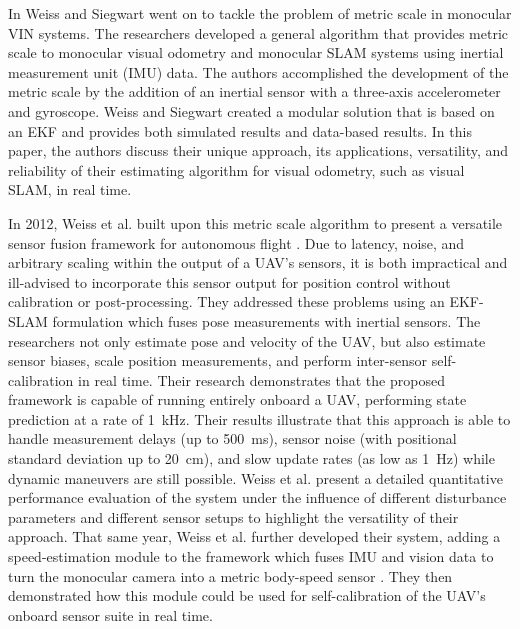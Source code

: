 In \cite{Weiss2011_2} Weiss and Siegwart went on to tackle the problem of metric scale in monocular VIN systems. The researchers developed a general algorithm that provides metric scale to monocular visual odometry and monocular SLAM systems using inertial measurement unit (IMU) data. The authors accomplished the development of the metric scale by the addition of an inertial sensor with a three-axis accelerometer and gyroscope. Weiss and Siegwart created a modular solution that is based on an EKF and provides both simulated results and data-based results. In this paper, the authors discuss their unique approach, its applications, versatility, and reliability of their estimating algorithm for visual odometry, such as visual SLAM, in real time. 

In 2012, Weiss et al. built upon this metric scale algorithm to present a versatile sensor fusion framework for autonomous flight \cite{Weiss2012}. Due to latency, noise, and arbitrary scaling within the output of a UAV's sensors, it is both impractical and ill-advised to incorporate this sensor output for position control without calibration or post-processing. They addressed these problems using an EKF-SLAM formulation which fuses pose measurements with inertial sensors. The researchers not only estimate pose and velocity of the UAV, but also estimate sensor biases, scale position measurements, and perform inter-sensor self-calibration in real time. Their research demonstrates that the proposed framework is capable of running entirely onboard a UAV, performing state prediction at a rate of 1~kHz. Their results illustrate that this approach is able to handle measurement delays (up to 500~ms), sensor noise (with positional standard deviation up to 20~cm), and slow update rates (as low as 1~Hz) while dynamic maneuvers are still possible. Weiss et al. present a detailed quantitative performance evaluation of the system under the influence of different disturbance parameters and different sensor setups to highlight the versatility of their approach. That same year, Weiss et al. further developed their system, adding a speed-estimation module to the framework which fuses IMU and vision data to turn the monocular camera into a metric body-speed sensor \cite{Weiss2012_2}. They then demonstrated how this module could be used for self-calibration of the UAV's onboard sensor suite in real time.

